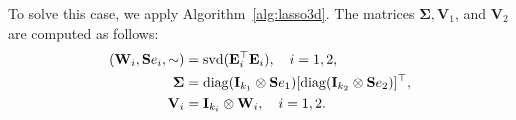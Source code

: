 \documentclass[10pt]{article}  	%
\theoremstyle{definition}
\theoremstyle{definition}
\newcommand{\R}{{\mathbb{R}}}
\newcommand{\Bc}{\boldsymbol{{\mathcal{B}}}}
\newcommand{\Xc}{ \boldsymbol{{\mathcal{X}}}}
\newcommand{\Uc}{\boldsymbol{{\mathcal{U}}}}
\newcommand{\Rc}{\boldsymbol{{\mathcal{R}}}}
\newcommand{\Zc}{\boldsymbol{{\mathcal{Z}}}}
\newcommand{\diag}{{\rm{diag}}}
\newcommand{\svd}{{\rm{svd}}}
\newcommand{\mE}{\mathbf{E}}
\newcommand{\mG}{\mathbf{G}}
\newcommand{\mI}{\mathbf{I}}
\newcommand{\mS}{\mathbf{S}}
\newcommand{\mV}{\mathbf{V}}
\newcommand{\mW}{\mathbf{W}}
\theoremstyle{remark}
\begin{document}
To solve this case, we apply Algorithm~\ref{alg:lasso3d}. The matrices 
$\boldsymbol{\Sigma}, \mV_1$, and $\mV_2$ are computed as follows:
\begin{align*}
(\mW_i, \mS{e_i}, \sim) &= \svd(\mE_i^\top \mE_i),\quad i = 1, 2,\\
\mathbf{\Sigma} &= \diag(\mI_{k_1}\otimes \mS{e_1})[\diag(\mI_{k_2}\otimes \mS{e_2})]^\top,\\
\mV_i &=\mI_{k_i}\otimes \mW_i, \quad i = 1, 2.
\end{align*}
%
\end{document}
